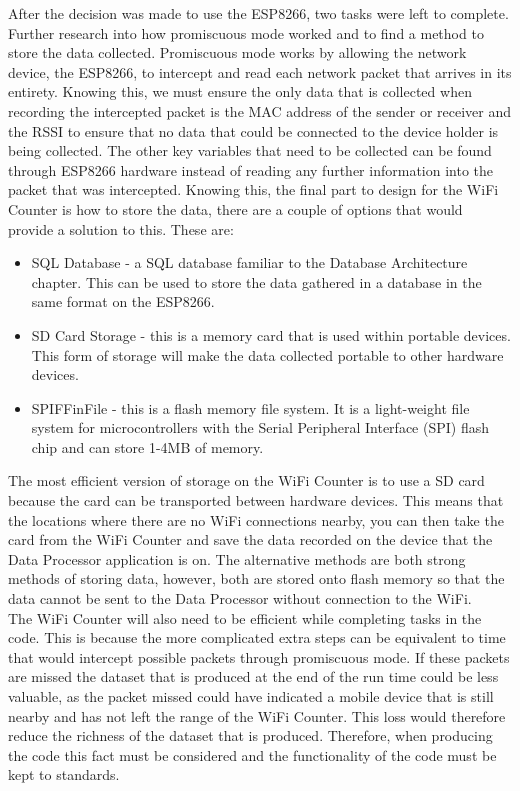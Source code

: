 \documentclass{report}
\begin{document}
After the decision was made to use the ESP8266, two tasks were left to complete. Further research into how promiscuous mode worked and to find a method to store the data collected. Promiscuous mode works by allowing the network device, the ESP8266, to intercept and read each network packet that arrives in its entirety\cite{Promiscuous_mode}. Knowing this, we must ensure the only data that is collected when recording the intercepted packet is the MAC address of the sender or receiver and the RSSI\cite{RSSI} to ensure that no data that could be connected to the device holder is being collected. The other key variables that need to be collected can be found through ESP8266 hardware instead of reading any further information into the packet that was intercepted. Knowing this, the final part to design for the WiFi Counter is how to store the data, there are a couple of options that would provide a solution to this. These are:
\begin{itemize}
    \item SQL Database - a SQL database familiar to the Database Architecture chapter. This can be used to store the data gathered in a database in the same format on the ESP8266.
    \item SD Card Storage - this is a memory card that is used within portable devices. This form of storage will make the data collected portable to other hardware devices.
    \item SPIFFinFile\cite{SPIFF} - this is a flash memory file system. It is a light-weight file system for microcontrollers with the Serial Peripheral Interface (SPI) flash chip and can store 1-4MB of memory. 
\end{itemize}
The most efficient version of storage on the WiFi Counter is to use a SD card because the card can be transported between hardware devices. This means that the locations where there are no WiFi connections nearby, you can then take the card from the WiFi Counter and save the data recorded on the device that the Data Processor application is on. The alternative methods are both strong methods of storing data, however, both are stored onto flash memory so that the data cannot be sent to the Data Processor without connection to the WiFi. \\ \newline
The WiFi Counter will also need to be efficient while completing tasks in the code. This is because the more complicated extra steps can be equivalent to time that would intercept possible packets through promiscuous mode. If these packets are missed the dataset that is produced at the end of the run time could be less valuable, as the packet missed could have indicated a mobile device that is still nearby and has not left the range of the WiFi Counter. This loss would therefore reduce the richness of the dataset that is produced. Therefore, when producing the code this fact must be considered and the functionality of the code must be kept to standards. \\ \newline
\end{document}
